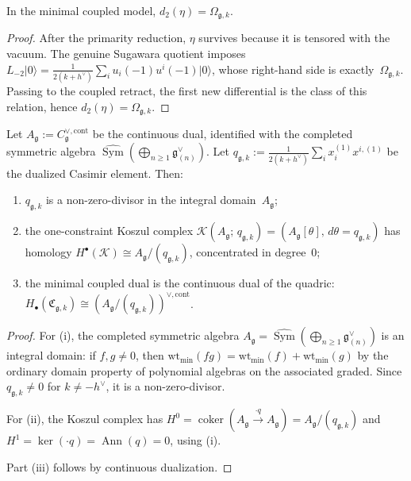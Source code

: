 \begin{theorem}
\label{thm:sugawara-casimir-transgression}
In the minimal coupled model, $d_2(\eta) = \Omega_{\mathfrak{g},k}$.
\end{theorem}

\begin{proof}
After the primarity reduction, $\eta$ survives because it is
tensored with the vacuum. The genuine Sugawara quotient imposes
$L_{-2}\lvert 0\rangle
= \tfrac{1}{2(k+h^\vee)} \sum_i u_i(-1)u^i(-1)\lvert 0\rangle$,
whose right-hand side is exactly~$\Omega_{\mathfrak{g},k}$.
Passing to the coupled retract, the first new differential is
the class of this relation, hence $d_2(\eta) = \Omega_{\mathfrak{g},k}$.
\end{proof}

\begin{theorem}
\label{thm:casimir-transgression-homology}
Let $A_\mathfrak{g} := C_\mathfrak{g}^{\vee,\mathrm{cont}}$ be the
continuous dual, identified with the completed symmetric algebra
$\widehat{\operatorname{Sym}}
(\bigoplus_{n \geq 1} \mathfrak{g}^\vee_{(n)})$.
Let $q_{\mathfrak{g},k}
:= \tfrac{1}{2(k+h^\vee)} \sum_i x_i^{(1)} x^{i,(1)}$
be the dualized Casimir element. Then:
\begin{enumerate}[label=\textup{(\roman*)}]
\item $q_{\mathfrak{g},k}$ is a non-zero-divisor in the
 integral domain~$A_\mathfrak{g}$;
\item the one-constraint Koszul complex
 $\mathcal{K}(A_\mathfrak{g};\, q_{\mathfrak{g},k})
 = (A_\mathfrak{g}[\theta],\, d\theta = q_{\mathfrak{g},k})$
 has homology
 $H^\bullet(\mathcal{K}) \cong A_\mathfrak{g}/(q_{\mathfrak{g},k})$,
 concentrated in degree~$0$;
\item the minimal coupled dual is the continuous dual of the
 quadric:
 $H_\bullet(\mathfrak{C}_{\mathfrak{g},k})
 \cong (A_\mathfrak{g}/(q_{\mathfrak{g},k}))^{\vee,\mathrm{cont}}$.
\end{enumerate}
\end{theorem}

\begin{proof}
For (i), the completed symmetric algebra
$A_\mathfrak{g} = \widehat{\operatorname{Sym}}
(\bigoplus_{n \geq 1} \mathfrak{g}^\vee_{(n)})$
is an integral domain: if $f, g \neq 0$, then
$\mathrm{wt}_{\min}(fg) = \mathrm{wt}_{\min}(f) + \mathrm{wt}_{\min}(g)$
by the ordinary domain property of polynomial algebras on the
associated graded. Since $q_{\mathfrak{g},k} \neq 0$ for
$k \neq -h^\vee$, it is a non-zero-divisor.

For (ii), the Koszul complex has
$H^0 = \operatorname{coker}(A_\mathfrak{g}
\xrightarrow{\cdot q} A_\mathfrak{g})
= A_\mathfrak{g}/(q_{\mathfrak{g},k})$
and $H^1 = \ker(\cdot q) = \operatorname{Ann}(q) = 0$,
using (i).

Part (iii) follows by continuous dualization.
\end{proof}


